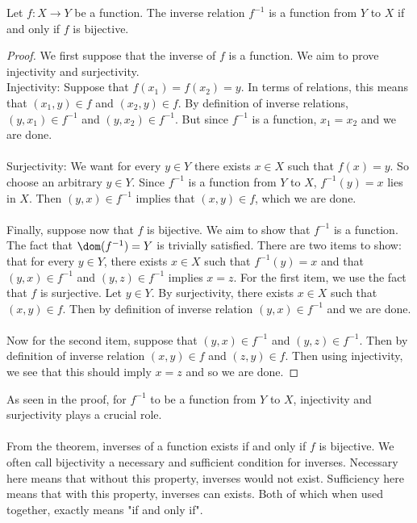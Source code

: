 \begin{thm}{}{} Let $f:X\to Y$ be a function. The inverse relation $f^{-1}$ is a function from $Y$ to $X$ if and only if $f$ is bijective. \tcbline
\begin{proof}
We first suppose that the inverse of $f$ is a function. We aim to prove injectivity and surjectivity. \\
Injectivity: Suppose that $f(x_1)=f(x_2)=y$. In terms of relations, this means that $(x_1,y)\in f$ and $(x_2,y)\in f$. By definition of inverse relations, $(y,x_1)\in f^{-1}$ and $(y,x_2)\in f^{-1}$. But since $f^{-1}$ is a function, $x_1=x_2$ and we are done. \\~\\
Surjectivity: We want for every $y\in Y$ there exists $x\in X$ such that $f(x)=y$. So choose an arbitrary $y\in Y$. Since $f^{-1}$ is a function from $Y$ to $X$, $f^{-1}(y)=x$ lies in $X$. Then $(y,x)\in f^{-1}$ implies that $(x,y)\in f$, which we are done. \\~\\

Finally, suppose now that $f$ is bijective. We aim to show that $f^{-1}$ is a function. The fact that $\dom(f^{-1})=Y$ is trivially satisfied. There are two items to show: that for every $y\in Y$, there exists $x\in X$ such that $f^{-1}(y)=x$ and that $(y,x)\in f^{-1}$ and $(y,z)\in f^{-1}$ implies $x=z$. For the first item, we use the fact that $f$ is surjective. Let $y\in Y$. By surjectivity, there exists $x\in X$ such that $(x,y)\in f$. Then by definition of inverse relation $(y,x)\in f^{-1}$ and we are done. \\~\\
Now for the second item, suppose that $(y,x)\in f^{-1}$ and $(y,z)\in f^{-1}$. Then by definition of inverse relation $(x,y)\in f$ and $(z,y)\in f$. Then using injectivity, we see that this should imply $x=z$ and so we are done. 
\end{proof}
\end{thm}

As seen in the proof, for $f^{-1}$ to be a function from $Y$ to $X$, injectivity and surjectivity plays a crucial role. \\~\\
From the theorem, inverses of a function exists if and only if $f$ is bijective. We often call bijectivity a necessary and sufficient condition for inverses. Necessary here means that without this property, inverses would not exist. Sufficiency here means that with this property, inverses can exists. Both of which when used together, exactly means "if and only if". 


